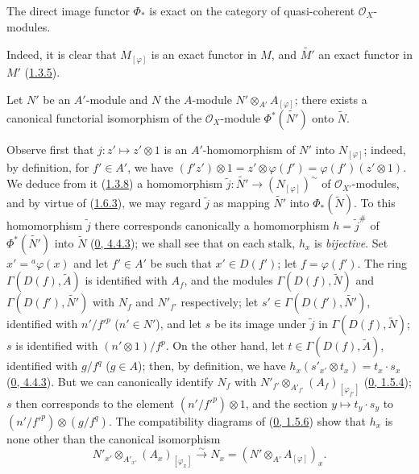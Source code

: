 \begin{corollary}[1.6.4]
\label{I.1.6.4}
The direct image functor $\Phi_*$ is exact on the category of
quasi-coherent $\mathscr{O}_X$-modules.
\end{corollary}

Indeed, it is clear that $M_{[\varphi]}$ is an exact functor in $M$, and
$\widetilde{M'}$ an exact functor in $M'$ (\hyperref[I.1.3.5]{1.3.5}).

\begin{proposition}[1.6.5]
\label{I.1.6.5}
Let $N'$ be an $A'$-module and $N$ the $A$-module
$N'\otimes_{A'}A_{[\varphi]}$; there exists a canonical functorial
isomorphism of the $\mathscr{O}_X$-module $\Phi^*(\widetilde{N'})$ onto
$\widetilde{N}$.
\end{proposition}

Observe first that $j:z'\mapsto z'\otimes 1$ is an
$A'$-homomorphism of $N'$ into $N_{[\varphi]}$; indeed, by definition,
for $f'\in A'$, we have
$(f'z')\otimes 1=z'\otimes\varphi(f')=\varphi(f')(z'\otimes 1)$. We
deduce from it (\hyperref[I.1.3.8]{1.3.8}) a homomorphism
$\widetilde{j}:\widetilde{N'}\to(N_{[\varphi]})^{\sim}$ of
$\mathscr{O}_{X'}$-modules, and by virtue of
(\hyperref[I.1.6.3]{1.6.3}), we may regard $\widetilde{j}$ as
mapping $\widetilde{N'}$ into $\Phi_*(\widetilde{N})$. To this homomorphism
$\widetilde{j}$ there corresponds canonically a homomorphism
$h=\widetilde{j}^{\#}$ of $\Phi^*(\widetilde{N'})$ into $\widetilde{N}$
(\hyperref[0.4.4.3]{0, 4.4.3}); we shall see that on each stalk,
$h_x$ is \emph{bijective}. Set $x'={}^a\varphi(x)$ and let $f'\in A'$ be
such that $x'\in D(f')$; let $f=\varphi(f')$. The ring
$\Gamma(D(f),\widetilde{A})$ is identified with $A_f$, and the modules
$\Gamma(D(f),\widetilde{N})$ and $\Gamma(D(f'),\widetilde{N'})$ with $N_f$
and $N'_{f'}$ respectively; let
$s'\in\Gamma(D(f'),\widetilde{N'})$, identified with $n'/{f'}^p$
($n'\in N'$), and let $s$ be its image under $\widetilde{j}$ in
$\Gamma(D(f),\widetilde{N})$; $s$ is identified with $(n'\otimes 1)/f^p$.
On the other hand, let $t\in\Gamma(D(f),\widetilde{A})$, identified with
$g/f^q$ ($g\in A$); then, by definition, we have
$h_x(s'_{x'}\otimes t_x)=t_x\cdot s_x$
(\hyperref[0.4.4.3]{0, 4.4.3}). But we can canonically identify
$N_f$ with
$N'_{f'}\otimes_{A'_{f'}}(A_f)_{[\varphi_{f'}]}$
(\hyperref[0.1.5.4]{0, 1.5.4}); $s$ then corresponds to the element
$(n'/{f'}^p)\otimes 1$, and the section $y\mapsto t_y\cdot s_y$ to
$(n'/{f'}^p)\otimes(g/f^q)$. The compatibility diagrams of
(\hyperref[0.1.5.6]{0, 1.5.6}) show that $h_x$ is none other than
the canonical isomorphism
\[
  \label{I.1.6.5.1}
  N'_{x'}\otimes_{A'_{x'}}(A_x)_{[\varphi_x]}
  \xrightarrow{\sim}N_x=(N'\otimes_{A'}A_{[\varphi]})_x.
  \tag{1.6.5.1}
\]

